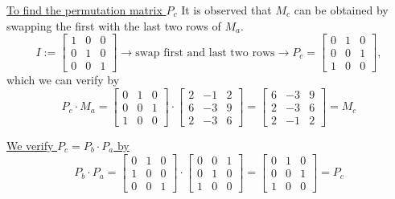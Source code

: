  \underline{To find the permutation matrix $P_c$}  It is observed that $M_c$ can be obtained by swapping the first with the last two rows of $M_a$. \\
 $$I:=\left[ \begin{array}{rrr} 1 & 0 & 0 \\ 0 & 1 & 0 \\ 0 & 0 & 1\end{array} \right] \rightarrow \text{swap first and last two rows} \rightarrow P_c = \left[ \begin{array}{rrr} 0 & 1 & 0 \\ 0 & 0 & 1 \\ 1 & 0 & 0\end{array} \right], $$
 which we can verify by \\
 $$P_c \cdot M_a = \left[ \begin{array}{rrr} 0 & 1 & 0 \\ 0 & 0 & 1 \\ 1 & 0 & 0\end{array} \right] \cdot \left[ \begin{array}{rrr}2 & -1 & 2 \\ 6 & -3 & 9 \\ 2 & -3 & 6\end{array} \right] = \left[ \begin{array}{rrr}6 & -3 & 9 \\ 2 & -3 & 6 \\ 2 & -1 & 2\end{array} \right] = M_c$$
  
  \underline{We verify $P_c = P_b \cdot P_a$ by} \\
 $$P_b \cdot P_a = \left[ \begin{array}{rrr} 0 & 1 & 0 \\ 1 & 0 & 0 \\ 0 & 0 & 1\end{array} \right] \cdot \left[ \begin{array}{rrr}0 & 0 & 1 \\ 0 & 1 & 0 \\ 1 & 0 & 0\end{array} \right] = \left[ \begin{array}{rrr}0 & 1 & 0 \\ 0 & 0 & 1 \\ 1 & 0 & 0\end{array} \right] = P_c$$
 \Qed
 
 \vspace*{.5cm}
 
